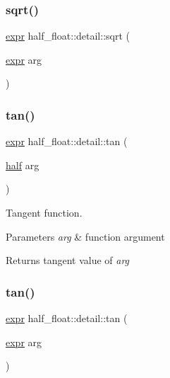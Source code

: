 \subsubsection{\texorpdfstring{sqrt()}{sqrt()}\hspace{0.1cm}{\footnotesize\ttfamily [2/2]}}
{\footnotesize\ttfamily \hyperlink{structhalf__float_1_1detail_1_1expr}{expr} half\+\_\+float\+::detail\+::sqrt (\begin{DoxyParamCaption}\item[{\hyperlink{structhalf__float_1_1detail_1_1expr}{expr}}]{arg }\end{DoxyParamCaption})\hspace{0.3cm}{\ttfamily [inline]}}

\mbox{\label{namespacehalf__float_1_1detail_a0173ced6e30b993f3c622c765ad53ea8}} 
\subsubsection{\texorpdfstring{tan()}{tan()}\hspace{0.1cm}{\footnotesize\ttfamily [1/2]}}
{\footnotesize\ttfamily \hyperlink{structhalf__float_1_1detail_1_1expr}{expr} half\+\_\+float\+::detail\+::tan (\begin{DoxyParamCaption}\item[{\hyperlink{classhalf__float_1_1half}{half}}]{arg }\end{DoxyParamCaption})\hspace{0.3cm}{\ttfamily [inline]}}

Tangent function. 
\begin{DoxyParams}{Parameters}
{\em arg} & function argument \\
\hline
\end{DoxyParams}
\begin{DoxyReturn}{Returns}
tangent value of {\itshape arg} 
\end{DoxyReturn}
\mbox{\label{namespacehalf__float_1_1detail_a570237a84cf8ce08088e61a60ed58a11}} 
\subsubsection{\texorpdfstring{tan()}{tan()}\hspace{0.1cm}{\footnotesize\ttfamily [2/2]}}
{\footnotesize\ttfamily \hyperlink{structhalf__float_1_1detail_1_1expr}{expr} half\+\_\+float\+::detail\+::tan (\begin{DoxyParamCaption}\item[{\hyperlink{structhalf__float_1_1detail_1_1expr}{expr}}]{arg }\end{DoxyParamCaption})\hspace{0.3cm}{\ttfamily [inline]}}

